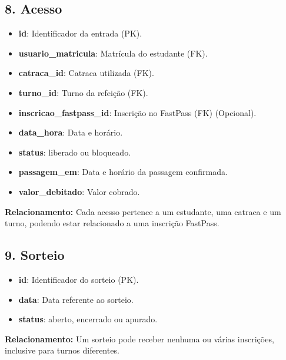 \documentclass[a4paper,12pt]{article}
\begin{document}
\subsection*{8. Acesso}
\begin{itemize}
    \item \textbf{id}: Identificador da entrada (PK).
    \item \textbf{usuario\_matricula}: Matrícula do estudante (FK).
    \item \textbf{catraca\_id}: Catraca utilizada (FK).
    \item \textbf{turno\_id}: Turno da refeição (FK).
    \item \textbf{inscricao\_fastpass\_id}: Inscrição no FastPass (FK) (Opcional).
    \item \textbf{data\_hora}: Data e horário.
    \item \textbf{status}: liberado ou bloqueado.
    \item \textbf{passagem\_em}: Data e horário da passagem confirmada.
    \item \textbf{valor\_debitado}: Valor cobrado.
\end{itemize}
\noindent\textbf{Relacionamento:} Cada acesso pertence a um estudante, 
uma catraca e um turno, podendo estar relacionado a uma inscrição FastPass. 
\subsection*{9. Sorteio}
\begin{itemize}
    \item \textbf{id}: Identificador do sorteio (PK).
    \item \textbf{data}: Data referente ao sorteio.
    \item \textbf{status}: aberto, encerrado ou apurado.
\end{itemize}
\noindent\textbf{Relacionamento:} Um sorteio pode receber nenhuma ou várias 
inscrições, inclusive para turnos diferentes. 
\end{document}
